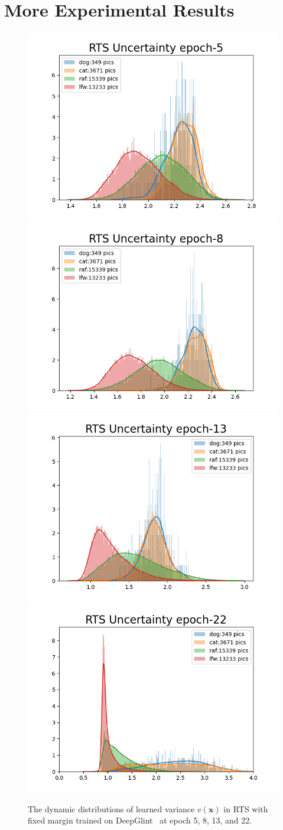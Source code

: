 \documentclass[letterpaper]{article} %
\begin{document}
\section{More Experimental Results}
\label{sec:exp}

\begin{figure}
\centering
  \includegraphics[width=0.39\linewidth]{figures/rts_deepglint_epoch5.png}
  \includegraphics[width=0.39\linewidth]{figures/rts_deepglint_epoch8.png}\\
  \includegraphics[width=0.39\linewidth]{figures/rts_deepglint_epoch13.png}
  \includegraphics[width=0.39\linewidth]{figures/rts_deepglint_epoch22.png}
  \caption{The dynamic distributions of learned variance $v(\bm{x})$ in RTS with fixed margin trained on DeepGlint~\cite{deepglint} at epoch 5, 8, 13, and 22.}
\label{fig:dynamic-dist}
\end{figure}
\end{document}
